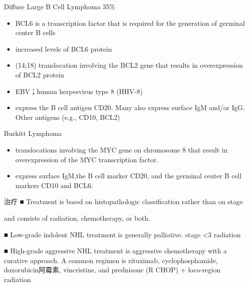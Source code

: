 \documentclass[
  ignorenonframetext,
]{beamer}
\begin{document}
\begin{frame}
\begin{block}{Diffuse Large B Cell Lymphoma 35\%}
\protect\hypertarget{diffuse-large-b-cell-lymphoma-35}{}
\begin{itemize}
\item
  BCL6 is a transcription factor that is required for the generation of
  germinal center B cells
\item
  increased levels of BCL6 protein
\item
  (14;18) translocation involving the BCL2 gene that results in
  overexpression of BCL2 protein
\item
  EBV；human herpesvirus type 8 (HHV-8)
\item
  express the B cell antigen CD20. Many also express surface IgM and/or
  IgG. Other antigens (e.g., CD10, BCL2)
\end{itemize}
\end{block}
\end{frame}

\begin{frame}
\begin{block}{Burkitt Lymphoma}
\protect\hypertarget{burkitt-lymphoma}{}
\begin{itemize}
\item
  translocations involving the MYC gene on chromosome 8 that result in
  overexpression of the MYC transcription factor.
\item
  express surface IgM,the B cell marker CD20, and the germinal center B
  cell markers CD10 and BCL6.
\end{itemize}
\end{block}
\end{frame}

\begin{frame}
\begin{block}{治疗}
\protect\hypertarget{ux6cbbux7597-10}{}
■ Treatment is based on histopathologic classification rather than on
stage

and consists of radiation, chemotherapy, or both.

■ Low-grade indolent NHL treatment is generally palliative. stage
\textless3 radiation

■ High-grade aggressive NHL treatment is aggressive chemotherapy with a
curative approach. A common regimen is rituximab, cyclophosphamide,
doxorubicin阿霉素, vincristine, and prednisone (R CHOP) + loco-region
radiation
\end{block}
\end{frame}
\end{document}

